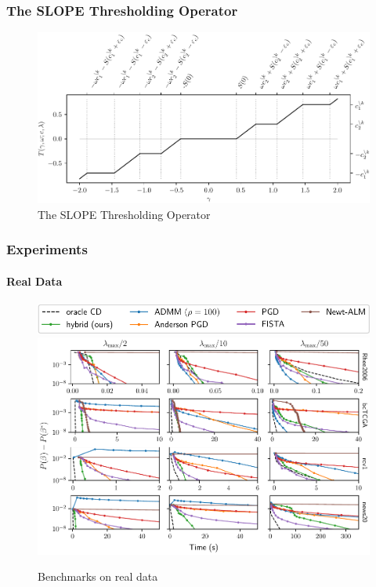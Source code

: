 \begin{frame}
  \frametitle{The SLOPE Thresholding Operator}

  \begin{figure}[htpb]
    \centering
    \includegraphics[width=\textwidth]{figures/slope-thresholding.pdf}
    \caption{%
      The SLOPE Thresholding Operator
    }
  \end{figure}
\end{frame}

\begin{frame}
  \frametitle{Experiments}
  \framesubtitle{Real Data}

  \begin{figure}[htpb]
    \centering
    \includegraphics[scale=0.55]{figures/real_legend.pdf}
    \includegraphics[scale=0.55]{figures/real.pdf}
    \caption{%
      Benchmarks on real data
    }
  \end{figure}
\end{frame}

